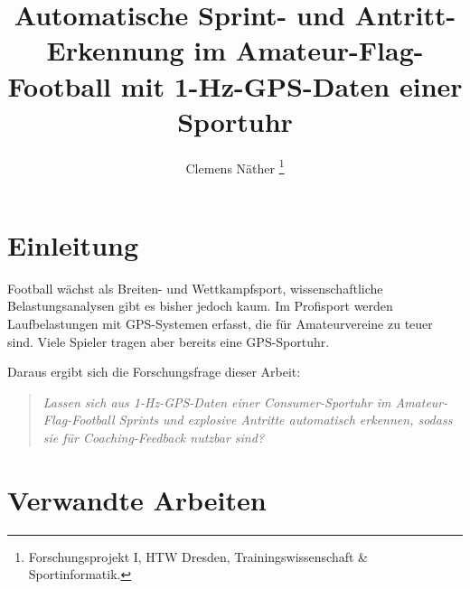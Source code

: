 \documentclass[journal]{IEEEtran}
\begin{document}
\title{Automatische Sprint- und Antritt-Erkennung im Amateur-Flag-Football mit 1-Hz-GPS-Daten einer Sportuhr}

\author{Clemens Näther%
\thanks{Forschungsprojekt I, HTW Dresden, Trainingswissenschaft \& Sportinformatik.}}


\maketitle

\begin{abstract}
\end{abstract}

\begin{IEEEkeywords}

\end{IEEEkeywords}

\section{Einleitung}

 Football wächst als Breiten- und Wettkampfsport, wissenschaftliche
Belastungsanalysen gibt es bisher jedoch kaum. Im Profisport werden Laufbelastungen
mit GPS-Systemen erfasst, die für Amateurvereine zu teuer sind. Viele Spieler tragen
aber bereits eine GPS-Sportuhr.


Daraus ergibt sich die Forschungsfrage dieser Arbeit:

\begin{quote}
\textit{Lassen sich aus 1-Hz-GPS-Daten einer Consumer-Sportuhr im Amateur-Flag-Football
Sprints und explosive Antritte automatisch erkennen, sodass sie für Coaching-Feedback
nutzbar sind?}
\end{quote}


\section{Verwandte Arbeiten}
\end{document}
